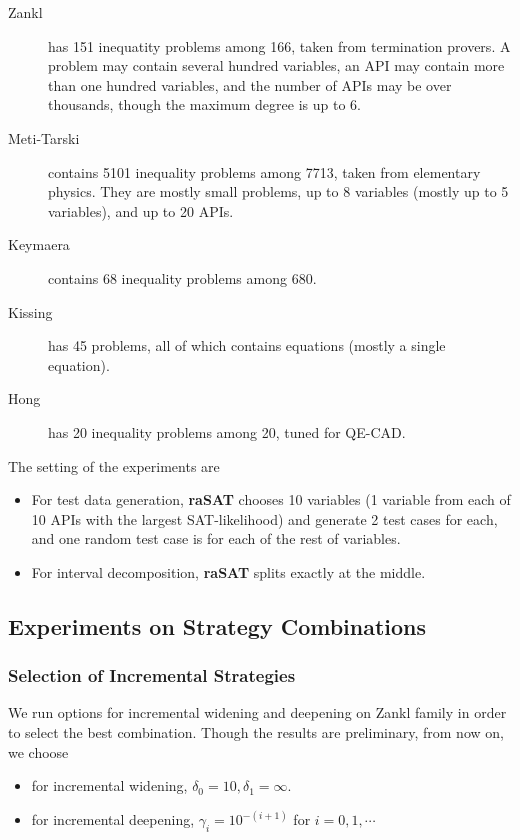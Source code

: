 \documentclass[runningheads,a4paper,oribibl]{llncs}
\begin{document}
\begin{description}
\item[Zankl] has 151 inequatity problems among 166, taken from termination provers. 
A problem may contain several hundred variables, an API may contain more than one hundred variables, 
and the number of APIs may be over thousands, though the maximum degree is up to $6$. 
\item[Meti-Tarski] contains 5101 inequality problems among 7713, taken from elementary physics.
They are mostly small problems, up to 8 variables (mostly up to 5 variables), and up to 20 APIs. 
\item[Keymaera] contains 68 inequality problems among 680. 
\item[Kissing] has 45 problems, all of which contains equations (mostly a single equation). 
\item[Hong] has 20 inequality problems among 20, tuned for QE-CAD. %
\end{description}

The setting of the experiments are
\begin{itemize}
\item For test data generation, {\bf raSAT} chooses 10 variables (1 variable from each of 10 APIs
  with the largest SAT-likelihood) and generate 2 test cases for each, and one random test case is
  for each of the rest of variables.
\item For interval decomposition, {\bf raSAT} splits exactly at the middle. 
\end{itemize}


\subsection{Experiments on Strategy Combinations} \label{sec:expstrategy}

\subsubsection*{Selection of Incremental Strategies}
We run options for incremental widening and deepening on Zankl family
in order to select the best combination. 
Though the results are preliminary, from now on, we choose 
\begin{itemize}
\item for incremental widening, $\delta_0 = 10, \delta_1 = \infty$.
\item for incremental deepening, $\gamma_i = 10^{-(i+1)}$ for $i = 0, 1, \cdots$
\end{itemize}
\end{document}
